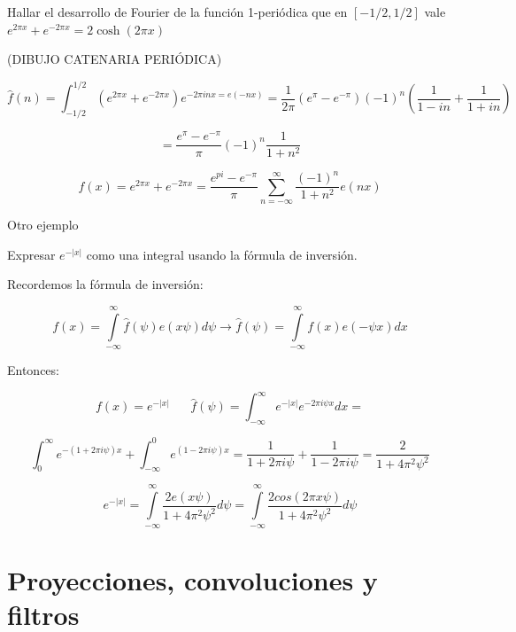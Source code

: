 \begin{example}

	Hallar el desarrollo de Fourier de la función 1-periódica que en $[-1/2, 1/2]$ vale $e^{2\pi x} + e^{-2\pi x } = 2 \cosh (2 \pi x)$

	(DIBUJO CATENARIA PERIÓDICA)


	$$\hat{f}(n) = \int ^{1/2}_{-1/2} \left( e^{2 \pi x} + e ^{-2 \pi x} \right) e ^{-2 \pi i n x = e (-nx)} = \frac{1}{2 \pi} (e^{\pi} - e^{-\pi}) (-1)^{n} \left( \frac{1}{1-in} + \frac{1}{1 + in} \right) $$

	$$ = \frac{e^{\pi} - e^{-\pi}}{\pi} (-1)^{n} \frac{1}{1 + n^2}$$

	$$ f(x) = e ^{2 \pi x} + e^{-2 \pi x} = \frac{e^{pi} - e^{-\pi}}{\pi} \sum_{n = -\infty}^{\infty} \frac{(-1)^n}{1 + n^2} e(nx) $$

\end{example}












\begin{example}{Otro ejemplo}

Expresar $e^{-|x|}$ como una integral usando la fórmula de inversión.


Recordemos la fórmula de inversión:

$$ f(x) = \int\limits^{\infty}_{-\infty} \hat{f}(\psi) e(x\psi) d\psi \rightarrow \hat{f}(\psi) = \int\limits^{\infty}_{-\infty} f(x) e(-\psi x) dx$$

Entonces:

$$f(x) = e^{-|x|} \;\;\;\;\;\; \hat{f}(\psi) = \int_{-\infty}^{\infty} e^{-|x|} e ^{-2 \pi i \psi x} dx = $$

$$ \int_{0}^{\infty} e ^{-(1 + 2 \pi i \psi) x} + \int_{-\infty}^{0} e ^{(1 - 2 \pi i \psi) x} = \frac{1}{1 + 2\pi i \psi} + \frac{1}{1-2 \pi i \psi} = \frac{2}{1 + 4 \pi^2 \psi^2}$$


$$e^{-|x|} = \int\limits_{-\infty}^{\infty} \frac{2 e (x \psi)}{1 + 4 \pi^2 \psi^2} d \psi = \int\limits^{\infty}_{-\infty} \frac{2 cos(2 \pi x \psi)}{1 + 4 \pi^2 \psi^2} d\psi $$

\end{example}

\section{Proyecciones, convoluciones y filtros}

